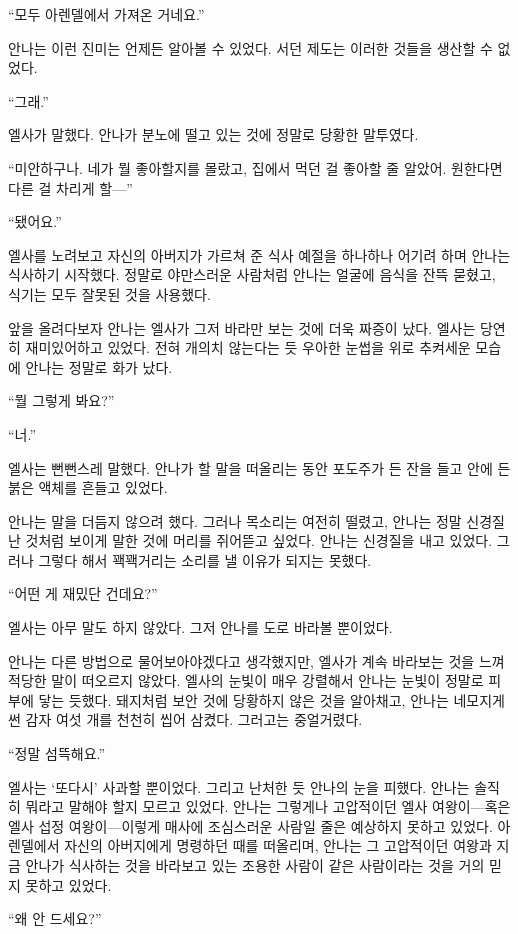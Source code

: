 ``모두 아렌델에서 가져온 거네요.''

안나는 이런 진미는 언제든 알아볼 수 있었다. 서던 제도는 이러한 것들을 생산할 수 없었다.

``그래.''

엘사가 말했다. 안나가 분노에 떨고 있는 것에 정말로 당황한 말투였다.

``미안하구나. 네가 뭘 좋아할지를 몰랐고, 집에서 먹던 걸 좋아할 줄 알았어. 원한다면 다른 걸 차리게 할—''

``됐어요.''

엘사를 노려보고 자신의 아버지가 가르쳐 준 식사 예절을 하나하나 어기려 하며 안나는 식사하기 시작했다. 정말로 야만스러운 사람처럼 안나는 얼굴에 음식을 잔뜩 묻혔고, 식기는 모두 잘못된 것을 사용했다.

앞을 올려다보자 안나는 엘사가 그저 바라만 보는 것에 더욱 짜증이 났다. 엘사는 당연히 재미있어하고 있었다. 전혀 개의치 않는다는 듯 우아한 눈썹을 위로 추켜세운 모습에 안나는 정말로 화가 났다.

``뭘 그렇게 봐요?''

``너.''

엘사는 뻔뻔스레 말했다. 안나가 할 말을 떠올리는 동안 포도주가 든 잔을 들고 안에 든 붉은 액체를 흔들고 있었다.

안나는 말을 더듬지 않으려 했다. 그러나 목소리는 여전히 떨렸고, 안나는 정말 신경질 난 것처럼 보이게 말한 것에 머리를 쥐어뜯고 싶었다. 안나는 신경질을 내고 있었다. 그러나 그렇다 해서 꽥꽥거리는 소리를 낼 이유가 되지는 못했다.

``어떤 게 재밌단 건데요?''

엘사는 아무 말도 하지 않았다. 그저 안나를 도로 바라볼 뿐이었다.

안나는 다른 방법으로 물어보아야겠다고 생각했지만, 엘사가 계속 바라보는 것을 느껴 적당한 말이 떠오르지 않았다. 엘사의 눈빛이 매우 강렬해서 안나는 눈빛이 정말로 피부에 닿는 듯했다. 돼지처럼 보안 것에 당황하지 않은 것을 알아채고, 안나는 네모지게 썬 감자 여섯 개를 천천히 씹어 삼켰다. 그러고는 중얼거렸다.

``정말 섬뜩해요.''

엘사는 `또다시' 사과할 뿐이었다. 그리고 난처한 듯 안나의 눈을 피했다. 안나는 솔직히 뭐라고 말해야 할지 모르고 있었다. 안나는 그렇게나 고압적이던 엘사 여왕이—혹은 엘사 섭정 여왕이—이렇게 매사에 조심스러운 사람일 줄은 예상하지 못하고 있었다. 아렌델에서 자신의 아버지에게 명령하던 때를 떠올리며, 안나는 그 고압적이던 여왕과 지금 안나가 식사하는 것을 바라보고 있는 조용한 사람이 같은 사람이라는 것을 거의 믿지 못하고 있었다.

``왜 안 드세요?''

